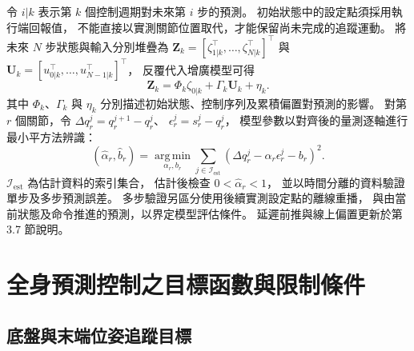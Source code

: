 令 $i|k$ 表示第 $k$ 個控制週期對未來第 $i$ 步的預測。
初始狀態中的設定點須採用執行端回報值，
不能直接以實測關節位置取代，才能保留尚未完成的追蹤運動。
將未來 $N$ 步狀態與輸入分別堆疊為
$\mathbf Z_k=[\zeta_{1|k}^{\top},\ldots,\zeta_{N|k}^{\top}]^{\top}$
與 $\mathbf U_k=[u_{0|k}^{\top},\ldots,u_{N-1|k}^{\top}]^{\top}$，
反覆代入增廣模型可得
\begin{equation}
    \mathbf Z_k=\Phi_k\zeta_{0|k}+\Gamma_k\mathbf U_k+\eta_k .
    \label{eq:ch3_condensed_augmented_prediction}
\end{equation}
其中 $\Phi_k$、$\Gamma_k$ 與 $\eta_k$
分別描述初始狀態、控制序列及累積偏置對預測的影響。
對第 $r$ 個關節，令
$\Delta q_r^j=q_r^{j+1}-q_r^j$、
$\epsilon_r^j=s_r^j-q_r^j$，
模型參數以對齊後的量測逐軸進行最小平方法辨識：
\begin{equation}
    (\hat\alpha_r,\hat b_r)=
    \underset{\alpha_r,b_r}{\operatorname{arg\,min}}
    \sum_{j\in\mathcal I_{\mathrm{est}}}
    \left(\Delta q_r^j-\alpha_r\epsilon_r^j-b_r\right)^2.
    \label{eq:ch3_arm_parameter_identification}
\end{equation}
$\mathcal I_{\mathrm{est}}$ 為估計資料的索引集合，
估計後檢查 $0<\hat\alpha_r<1$，
並以時間分離的資料驗證單步及多步預測誤差。
多步驗證另區分使用後續實測設定點的離線重播，
與由當前狀態及命令推進的預測，以界定模型評估條件。
延遲前推與線上偏置更新於第 3.7 節說明。

\section{全身預測控制之目標函數與限制條件}
\label{sec:wholebody_objective_constraints}

\subsection{底盤與末端位姿追蹤目標}
\label{subsec:wholebody_tracking_objective}

